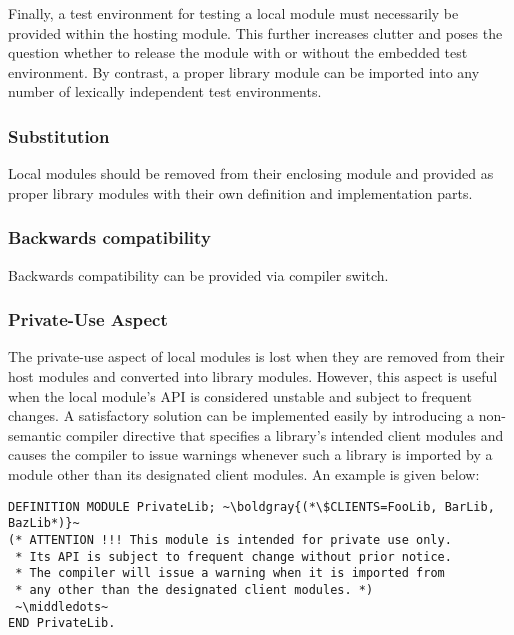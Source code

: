 \documentclass[10pt,a4paper]{article}
\newcommand\boldgray[1]{\textcolor{gray}{\textbf{#1}}}
\newcommand\middledots{\textperiodcentered\textperiodcentered\textperiodcentered}
\begin{document}
Finally, a test environment for testing a local module must necessarily be
provided within the hosting module.  This further increases clutter and poses
the question whether to release the module with or without the embedded test
environment. By contrast, a proper library module can be imported into any
number of lexically independent test environments.

\subsubsection{Substitution}
Local modules should be removed from their enclosing module and provided as
proper library modules with their own definition and implementation parts.

\subsubsection{Backwards compatibility}

Backwards compatibility can be provided via compiler switch.

\subsubsection{Private-Use Aspect}

The private-use aspect of local modules is lost when they are removed from
their host modules and converted into library modules. However, this aspect
is useful when the local module's API is considered unstable and subject to
frequent changes. A satisfactory solution can be implemented easily by
introducing a \gls{non-semantic compiler directive} that specifies a
library's intended client modules and causes the compiler to issue warnings
whenever such a library is imported by a module other than its designated
client modules. An example is given below:

\lstset{style=modula2}
\begin{lstlisting}[escapechar=~]
DEFINITION MODULE PrivateLib; ~\boldgray{(*\$CLIENTS=FooLib, BarLib, BazLib*)}~
(* ATTENTION !!! This module is intended for private use only.
 * Its API is subject to frequent change without prior notice.
 * The compiler will issue a warning when it is imported from
 * any other than the designated client modules. *)
 ~\middledots~
END PrivateLib.
\end{lstlisting}


\end{document}
